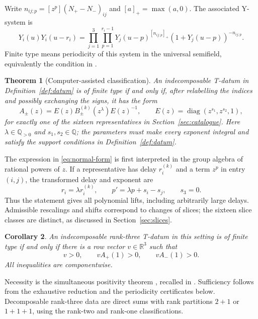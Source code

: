 \documentclass[11pt,a4paper]{article}
\newtheorem{theorem}{Theorem}[section]
\newtheorem{corollary}[theorem]{Corollary}
\theoremstyle{definition}
\DeclareMathOperator{\diag}{diag}
\newcommand{\Q}{\mathbb Q}
\newcommand{\R}{\mathbb R}
\begin{document}
Write $n_{ij;p}=[z^p](N_+-N_-)_{ij}$ and $[a]_+=\max(a,0)$.
The associated Y-system is
\begin{equation}\label{eq:ysystem}
 Y_i(u)Y_i(u-r_i)=
 \prod_{j=1}^{3}\prod_{p=1}^{r_i-1}
 Y_j(u-p)^{[n_{ij;p}]_+}(1+Y_j(u-p))^{-n_{ij;p}}.
\end{equation}
Finite type means periodicity of this system in the universal semifield,
equivalently the condition in \cite[Definition 1.4]{MizunoRankTwo}.

\begin{theorem}[Computer-assisted classification]\label{thm:classification}
An indecomposable T-datum in Definition~\ref{def:datum} is of finite type if
and only if, after relabelling the indices and possibly exchanging the signs,
it has the form
\begin{equation}\label{eq:normal-form}
 A_\pm(z)=E(z)B_\pm^{(k)}(z^\lambda)E(z)^{-1},\qquad
 E(z)=\diag(z^{s_1},z^{s_2},1),
\end{equation}
for exactly one of the sixteen representatives in
Section~\ref{sec:catalogue}. Here $\lambda\in\Q_{>0}$ and $s_1,s_2\in\Q$;
the parameters must make every exponent integral and satisfy the support
conditions in Definition~\ref{def:datum}.
\end{theorem}

The expression in \eqref{eq:normal-form} is first interpreted in the group
algebra of rational powers of $z$. If a representative has delay $r_i^{(k)}$
and a term $z^p$ in entry $(i,j)$, the transformed delay and exponent are
\begin{equation}\label{eq:parameters}
 r_i=\lambda r_i^{(k)},\qquad p'=\lambda p+s_i-s_j,\qquad s_3=0.
\end{equation}
Thus the statement gives all polynomial lifts, including arbitrarily large
delays. Admissible rescalings and shifts correspond to changes of slices;
the sixteen slice classes are distinct, as discussed in
Section~\ref{sec:slices}.

\begin{corollary}\label{cor:positivity}
An indecomposable rank-three T-datum in this setting is of finite type if
and only if there is a row vector $v\in\R^3$ such that
\begin{equation}\label{eq:positivity}
 v>0,\qquad vA_+(1)>0,\qquad vA_-(1)>0.
\end{equation}
All inequalities are componentwise.
\end{corollary}

Necessity is the simultaneous positivity theorem
\cite[Theorem 5.5]{MizunoTData}, recalled in
\cite[Lemma 3.3]{MizunoRankTwo}. Sufficiency follows from the exhaustive
reduction and the periodicity certificates below. Decomposable rank-three
data are direct sums with rank partitions $2+1$ or $1+1+1$, using the
rank-two and rank-one classifications.
\end{document}
